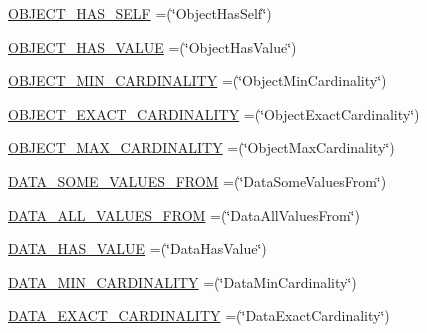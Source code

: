 \begin{DoxyCompactItemize}
\item 
\hyperlink{enumorg_1_1semanticweb_1_1owlapi_1_1vocab_1_1_o_w_l_x_m_l_vocabulary_aad2e391852ffb382834e987d71d1c928}{O\-B\-J\-E\-C\-T\-\_\-\-H\-A\-S\-\_\-\-S\-E\-L\-F} =(\char`\"{}Object\-Has\-Self\char`\"{})
\item 
\hyperlink{enumorg_1_1semanticweb_1_1owlapi_1_1vocab_1_1_o_w_l_x_m_l_vocabulary_a33a101ce9f0761ddc5b8f150705853c4}{O\-B\-J\-E\-C\-T\-\_\-\-H\-A\-S\-\_\-\-V\-A\-L\-U\-E} =(\char`\"{}Object\-Has\-Value\char`\"{})
\item 
\hyperlink{enumorg_1_1semanticweb_1_1owlapi_1_1vocab_1_1_o_w_l_x_m_l_vocabulary_a7994f5f2e39cc7bfb3c864e7e93ccefb}{O\-B\-J\-E\-C\-T\-\_\-\-M\-I\-N\-\_\-\-C\-A\-R\-D\-I\-N\-A\-L\-I\-T\-Y} =(\char`\"{}Object\-Min\-Cardinality\char`\"{})
\item 
\hyperlink{enumorg_1_1semanticweb_1_1owlapi_1_1vocab_1_1_o_w_l_x_m_l_vocabulary_af23f3bd41aa60f676632d8c1c245d3fa}{O\-B\-J\-E\-C\-T\-\_\-\-E\-X\-A\-C\-T\-\_\-\-C\-A\-R\-D\-I\-N\-A\-L\-I\-T\-Y} =(\char`\"{}Object\-Exact\-Cardinality\char`\"{})
\item 
\hyperlink{enumorg_1_1semanticweb_1_1owlapi_1_1vocab_1_1_o_w_l_x_m_l_vocabulary_a66516d141bc39bb382a5df709ccf3358}{O\-B\-J\-E\-C\-T\-\_\-\-M\-A\-X\-\_\-\-C\-A\-R\-D\-I\-N\-A\-L\-I\-T\-Y} =(\char`\"{}Object\-Max\-Cardinality\char`\"{})
\item 
\hyperlink{enumorg_1_1semanticweb_1_1owlapi_1_1vocab_1_1_o_w_l_x_m_l_vocabulary_ac748c6fd392cc91a1b306a5156983963}{D\-A\-T\-A\-\_\-\-S\-O\-M\-E\-\_\-\-V\-A\-L\-U\-E\-S\-\_\-\-F\-R\-O\-M} =(\char`\"{}Data\-Some\-Values\-From\char`\"{})
\item 
\hyperlink{enumorg_1_1semanticweb_1_1owlapi_1_1vocab_1_1_o_w_l_x_m_l_vocabulary_a5642f0c68a1d49ddc332f81faf49c056}{D\-A\-T\-A\-\_\-\-A\-L\-L\-\_\-\-V\-A\-L\-U\-E\-S\-\_\-\-F\-R\-O\-M} =(\char`\"{}Data\-All\-Values\-From\char`\"{})
\item 
\hyperlink{enumorg_1_1semanticweb_1_1owlapi_1_1vocab_1_1_o_w_l_x_m_l_vocabulary_aa70c01c96215fde07834ce6264b9c108}{D\-A\-T\-A\-\_\-\-H\-A\-S\-\_\-\-V\-A\-L\-U\-E} =(\char`\"{}Data\-Has\-Value\char`\"{})
\item 
\hyperlink{enumorg_1_1semanticweb_1_1owlapi_1_1vocab_1_1_o_w_l_x_m_l_vocabulary_aee96fc5dcbd201792d9fba3d324d6d0f}{D\-A\-T\-A\-\_\-\-M\-I\-N\-\_\-\-C\-A\-R\-D\-I\-N\-A\-L\-I\-T\-Y} =(\char`\"{}Data\-Min\-Cardinality\char`\"{})
\item 
\hyperlink{enumorg_1_1semanticweb_1_1owlapi_1_1vocab_1_1_o_w_l_x_m_l_vocabulary_aecb1e6f89d1d1521df90c02de8483b17}{D\-A\-T\-A\-\_\-\-E\-X\-A\-C\-T\-\_\-\-C\-A\-R\-D\-I\-N\-A\-L\-I\-T\-Y} =(\char`\"{}Data\-Exact\-Cardinality\char`\"{})

\end{DoxyCompactItemize}
